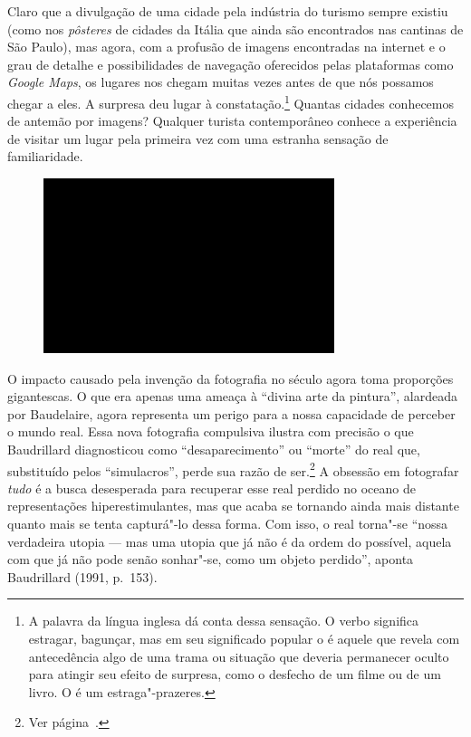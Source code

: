 Claro que a divulgação de uma cidade pela indústria do turismo sempre
existiu (como nos \emph{pôsteres} de cidades da Itália que ainda são
encontrados nas cantinas de São Paulo), mas agora, com a profusão de
imagens encontradas na internet e o grau de detalhe e possibilidades de
navegação oferecidos pelas plataformas como \emph{Google Maps}, os
lugares nos chegam muitas vezes antes de que nós possamos chegar a eles.
A surpresa deu lugar à constatação.\footnote{A palavra da língua inglesa
  {} dá conta dessa sensação. O verbo {}
  significa estragar, bagunçar, mas em seu significado popular o
  {} é aquele que revela com antecedência algo de uma trama
  ou situação que deveria permanecer oculto para atingir seu efeito de
  surpresa, como o desfecho de um filme ou de um livro. O {}
  é um estraga"-prazeres.} Quantas cidades conhecemos de antemão por
imagens? Qualquer turista contemporâneo conhece a experiência de visitar
um lugar pela primeira vez com uma estranha sensação de familiaridade.

\begin{figure}[!ht]

\centering
 \includegraphics[width=85mm]{./imgs/im1.jpg}
\caption{\tiny{}}

\end{figure}

O impacto causado pela invenção da fotografia no século  agora toma
proporções gigantescas. O que era apenas uma ameaça à ``divina arte da
pintura'', alardeada por Baudelaire, agora representa um perigo para a
nossa capacidade de perceber o mundo real. Essa nova fotografia compulsiva ilustra com \label{compulsiva} precisão o que Baudrillard diagnosticou como ``desaparecimento'' ou ``morte'' do real que, substituído pelos ``simulacros'', perde sua razão de ser.\footnote{Ver página~\pageref{deficit}.} A obsessão em fotografar \emph{tudo} é a busca desesperada para recuperar esse real perdido no oceano de representações hiperestimulantes, mas que acaba se tornando ainda mais distante quanto mais se tenta capturá"-lo dessa forma. Com isso, o real torna"-se ``nossa verdadeira utopia --- mas uma utopia que já não é da ordem do possível, aquela com que já não pode senão sonhar"-se, como um objeto perdido'', aponta Baudrillard (1991, p.~153).


